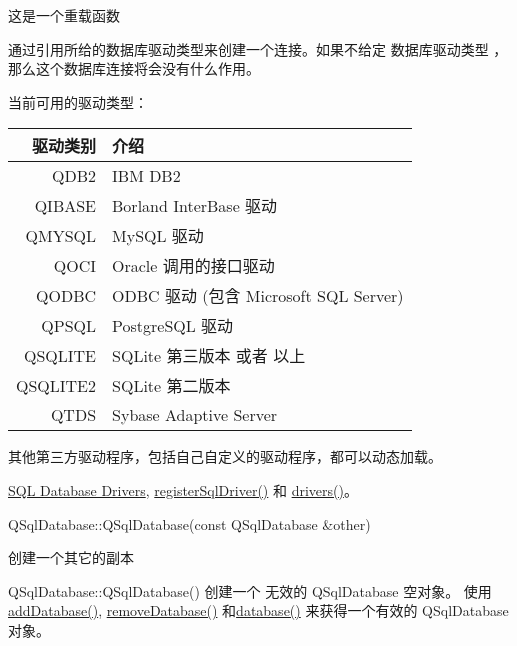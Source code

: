 这是一个重载函数

通过引用所给的数据库驱动类型来创建一个连接。如果不给定 数据库驱动类型 ，那么这个数据库连接将会没有什么作用。

当前可用的驱动类型：

\begin{tabular}{|r|l|}
	\hline	
	驱动类别& 介绍\\
	\hline
	QDB2&	IBM DB2\\
		\hline
	QIBASE	&Borland InterBase 驱动\\
		\hline
	QMYSQL	&MySQL 驱动\\
		\hline
	QOCI	&Oracle 调用的接口驱动\\
		\hline
	QODBC	&ODBC 驱动 (包含 Microsoft SQL Server)\\
		\hline
	QPSQL	&PostgreSQL 驱动\\
		\hline
	QSQLITE	&SQLite 第三版本 或者 以上\\
		\hline
	QSQLITE2&	SQLite 第二版本\\
		\hline
	QTDS	&Sybase Adaptive Server\\
	\hline
\end{tabular}

其他第三方驱动程序，包括自己自定义的驱动程序，都可以动态加载。

\begin{notice}[另请参阅]
\href{https://doc.qt.io/qt-5/sql-driver.html}{SQL Database Drivers}, \href{https://github.com/QtDocumentCN/QtDocumentCN/blob/master/Src/S/QSqlDatabase/QSqlDatabase.md#static-void-qsqldatabaseregistersqldriverconst-qstring-name-qsqldrivercreatorbase-creator}{registerSqlDriver()} 和 \href{https://github.com/QtDocumentCN/QtDocumentCN/blob/master/Src/S/QSqlDatabase/QSqlDatabase.md#static-qstringlist-qsqldatabasedrivers}{drivers()}。
\end{notice}


QSqlDatabase::QSqlDatabase(const QSqlDatabase \&other)

创建一个其它的副本

QSqlDatabase::QSqlDatabase()
创建一个 无效的 QSqlDatabase 空对象。
使用\href{https://github.com/QtDocumentCN/QtDocumentCN/blob/master/Src/S/QSqlDatabase/QSqlDatabase.md#static-qsqldatabase-qsqldatabaseadddatabaseconst-qstring-type-const-qstring-connectionname--qlatin1stringdefaultconnection}{addDatabase()},  \href{https://github.com/QtDocumentCN/QtDocumentCN/blob/master/Src/S/QSqlDatabase/QSqlDatabase.md#static-void-qsqldatabaseremovedatabaseconst-qstring-connectionname}{removeDatabase()} 和\href{https://github.com/QtDocumentCN/QtDocumentCN/blob/master/Src/S/QSqlDatabase/QSqlDatabase.md#static-qsqldatabase-qsqldatabasedatabaseconst-qstring-connectionname--qlatin1stringdefaultconnection-bool-open--true}{database()} 来获得一个有效的 QSqlDatabase 对象。

